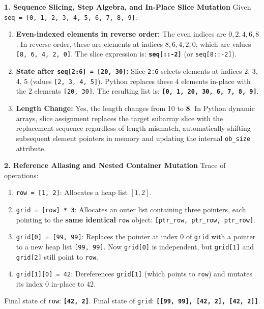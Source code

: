 \textbf{1. Sequence Slicing, Step Algebra, and In-Place Slice Mutation}
Given \texttt{seq = [0, 1, 2, 3, 4, 5, 6, 7, 8, 9]}:
\begin{enumerate}
    \item \textbf{Even-indexed elements in reverse order:}
    The even indices are $0, 2, 4, 6, 8$. In reverse order, these are elements at indices $8, 6, 4, 2, 0$, which are values \texttt{[8, 6, 4, 2, 0]}.
    The slice expression is: \textbf{\texttt{seq[::-2]}} (or \texttt{seq[8::-2]}).
    \item \textbf{State after \texttt{seq[2:6] = [20, 30]}:}
    Slice \texttt{2:6} selects elements at indices 2, 3, 4, 5 (values \texttt{[2, 3, 4, 5]}).
    Python replaces these 4 elements in-place with the 2 elements \texttt{[20, 30]}.
    The resulting list is: \textbf{\texttt{[0, 1, 20, 30, 6, 7, 8, 9]}}.
    \item \textbf{Length Change:}
    Yes, the length changes from 10 to \textbf{8}.
    In Python dynamic arrays, slice assignment replaces the target subarray slice with the replacement sequence regardless of length mismatch, automatically shifting subsequent element pointers in memory and updating the internal \texttt{ob\_size} attribute.
\end{enumerate}

\textbf{2. Reference Aliasing and Nested Container Mutation}
Trace of operations:
\begin{enumerate}
    \item \texttt{row = [1, 2]}: Allocates a heap list $[1, 2]$.
    \item \texttt{grid = [row] * 3}: Allocates an outer list containing three pointers, each pointing to the \textbf{same identical} \texttt{row} object: \texttt{[ptr\_row, ptr\_row, ptr\_row]}.
    \item \texttt{grid[0] = [99, 99]}: Replaces the pointer at index 0 of \texttt{grid} with a pointer to a new heap list \texttt{[99, 99]}. Now \texttt{grid[0]} is independent, but \texttt{grid[1]} and \texttt{grid[2]} still point to \texttt{row}.
    \item \texttt{grid[1][0] = 42}: Dereferences \texttt{grid[1]} (which points to \texttt{row}) and mutates its index 0 in-place to $42$.
\end{enumerate}
Final state of \texttt{row}: \textbf{\texttt{[42, 2]}}.
Final state of \texttt{grid}: \textbf{\texttt{[[99, 99], [42, 2], [42, 2]]}}.

